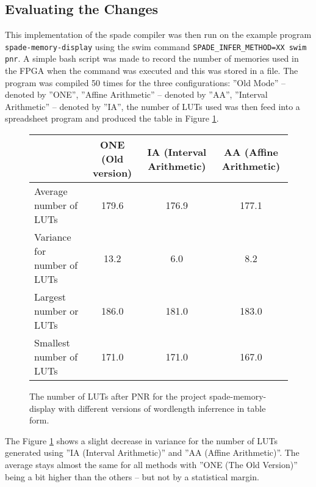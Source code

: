 \documentclass[msc,lith,english]{liuthesis}
\begin{document}
\subsection{Evaluating the Changes}
This implementation of the spade compiler was then run on the example program \verb+spade-memory-display+ using the swim command \verb+SPADE_INFER_METHOD=XX swim pnr+. A simple bash script was made to record the number of memories used in the FPGA when the command was executed and this was stored in a file. The program was compiled 50 times for the three configurations: ''Old Mode'' -- denoted by ''ONE'', ''Affine Arithmetic'' -- denoted by ''AA'', ''Interval Arithmetic'' -- denoted by ''IA'', the number of LUTs used was then feed into a spreadsheet program and produced the table in Figure \ref{fig:SpadeCompilations50Table}.


\begin{figure}
\begin{center}
\begin{tabular}{l | c c c}
  & ONE (Old version) & IA (Interval Arithmetic) & AA (Affine Arithmetic) \\
\hline
Average number of LUTs&179.6&176.9 & 177.1 \\
Variance for number of LUTs &13.2&6.0&8.2 \\
Largest number or LUTs&186.0&181.0&183.0 \\
Smallest number of LUTs&171.0&171.0&167.0 \\
\end{tabular}
  \caption{The number of LUTs after PNR for the project spade-memory-display with different versions of wordlength inferrence in table form.}
  \label{fig:SpadeCompilations50Table}
\end{center}
\end{figure}


The Figure \ref{fig:SpadeCompilations50Table} shows a slight decrease in variance for the number of LUTs generated using ''IA (Interval Arithmetic)'' and ''AA (Affine Arithmetic)''. The average stays almost the same for all methods with ''ONE (The Old Version)'' being a bit higher than the others -- but not by a statistical margin.
\end{document}
